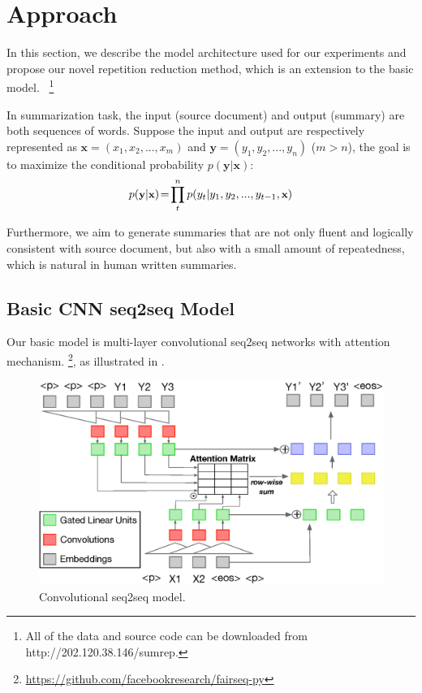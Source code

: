 \section{Approach}
\label{sec:approach}

In this section, we describe the model architecture used for our experiments
and propose our novel repetition reduction method, which is an extension to the basic model.
~\footnote{
All of the data and source code
can be downloaded from http://202.120.38.146/sumrep.}

In summarization task, the input (source document) and
output (summary) are both sequences of words.
Suppose the input and output are respectively represented as
$\textbf{x} = (x_{1},x_{2},...,x_{m})$ and 
$\textbf{y} = (y_{1}, y_{2},..., y_{n})$ ($m>n$),
the goal is to maximize the conditional probability
$p(\textbf{y}|\textbf{x})$:
\begin{equation}
\small
p(\textbf{y} | \textbf{x}) \!=\! {\prod^n_{t} {p(y_{t} | y_{1}, y_{2},..., y_{t-1}, \textbf{x}})}
\end{equation}

Furthermore, we aim to generate summaries that are not only fluent 
and logically consistent with source document, but also with 
a small amount of repeatedness, which is natural in human written summaries.  

\subsection{Basic CNN seq2seq Model}
\label{sec:basic}
Our basic model is multi-layer convolutional seq2seq networks \citep{gehring2017convs2s} with attention mechanism.
\footnote{\url{https://github.com/facebookresearch/fairseq-py}}, 
as illustrated in . 

\begin{figure}[th]
    \centering
    \includegraphics[width=0.8\linewidth]{cnn}
    \caption{Convolutional seq2seq model.}
    \label{fig:basicModel}
\end{figure}

